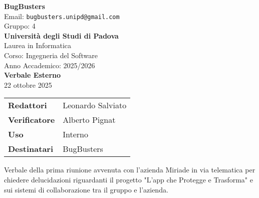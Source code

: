 \documentclass[a4paper,12pt]{article}
\begin{document}
\begin{center}  
  
  {\Large\bfseries\color{primaryblue} BugBusters}\\[0.3cm]
  {\small\color{darkgray} Email: \texttt{bugbusters.unipd@gmail.com}} \\[0.1cm]
  {\small\color{darkgray} Gruppo: 4} \\[0.5cm]

  {\large\bfseries Università degli Studi di Padova}\\[0.3cm]
  {\small Laurea in Informatica}\\[0.2cm]
  {\small Corso: Ingegneria del Software}\\[0.2cm]
  {\small Anno Accademico: 2025/2026}\\[0.8cm]

  {\Huge\bfseries\color{primaryblue} Verbale Esterno}\\[0.3cm]
  {\Large\color{secondaryblue} 22 ottobre 2025}\\[0.8cm]
\end{center}

\begin{center}
\begin{tcolorbox}[colback=lightgray,colframe=primaryblue,width=0.85\textwidth,arc=3mm,boxrule=0.5pt]
\begin{tabular}{@{}ll@{}}
\textbf{Redattori}    & Leonardo Salviato \\
\textbf{Verificatore}    & Alberto Pignat \\
\textbf{Uso}          & Interno \\
\textbf{Destinatari}  & BugBusters \\
\end{tabular}
\end{tcolorbox}
\end{center}

\vspace{0.5cm}

\begin{center}
\begin{tcolorbox}[colback=secondaryblue!10,colframe=secondaryblue,width=0.9\textwidth,arc=3mm,boxrule=0.8pt,title={\bfseries Abstract}]
Verbale della prima riunione avvenuta con l'azienda Miriade in via telematica per chiedere delucidazioni riguardanti il progetto "L'app che Protegge e Trasforma" e sui sistemi di collaborazione tra il gruppo e l'azienda.
\end{tcolorbox}
\end{center}
\end{document}
